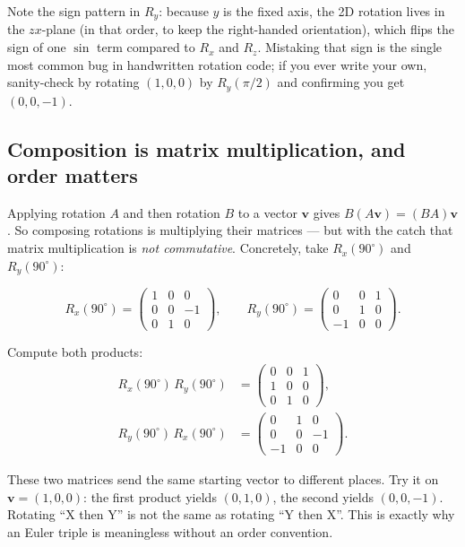 \documentclass{article}
\begin{document}
\noindent Note the sign pattern in $R_y$: because $y$ is the fixed axis, the
2D rotation lives in the $zx$-plane (in that order, to keep the right-handed
orientation), which flips the sign of one $\sin$ term compared to $R_x$ and
$R_z$. Mistaking that sign is the single most common bug in handwritten
rotation code; if you ever write your own, sanity-check by rotating
$(1,0,0)$ by $R_y(\pi/2)$ and confirming you get $(0,0,-1)$.

\subsection{Composition is matrix multiplication, and order matters}

Applying rotation $A$ and then rotation $B$ to a vector $\mathbf{v}$ gives
$B(A\mathbf{v}) = (BA)\mathbf{v}$. So composing rotations is multiplying
their matrices --- but with the catch that matrix multiplication is
\emph{not commutative}. Concretely, take $R_x(90^\circ)$ and $R_y(90^\circ)$:

\begin{equation*}
R_x(90^\circ) = \begin{pmatrix}1 & 0 & 0\\ 0 & 0 & -1\\ 0 & 1 & 0\end{pmatrix},\qquad
R_y(90^\circ) = \begin{pmatrix}0 & 0 & 1\\ 0 & 1 & 0\\ -1 & 0 & 0\end{pmatrix}.
\end{equation*}

Compute both products:
\begin{align*}
R_x(90^\circ)\,R_y(90^\circ) &= \begin{pmatrix}0 & 0 & 1\\ 1 & 0 & 0\\ 0 & 1 & 0\end{pmatrix},\\[4pt]
R_y(90^\circ)\,R_x(90^\circ) &= \begin{pmatrix}0 & 1 & 0\\ 0 & 0 & -1\\ -1 & 0 & 0\end{pmatrix}.
\end{align*}

\noindent These two matrices send the same starting vector to different
places. Try it on $\mathbf{v} = (1,0,0)$: the first product yields
$(0,1,0)$, the second yields $(0,0,-1)$. Rotating ``X then Y'' is not the
same as rotating ``Y then X''. This is exactly why an Euler triple is
meaningless without an order convention.
\end{document}
